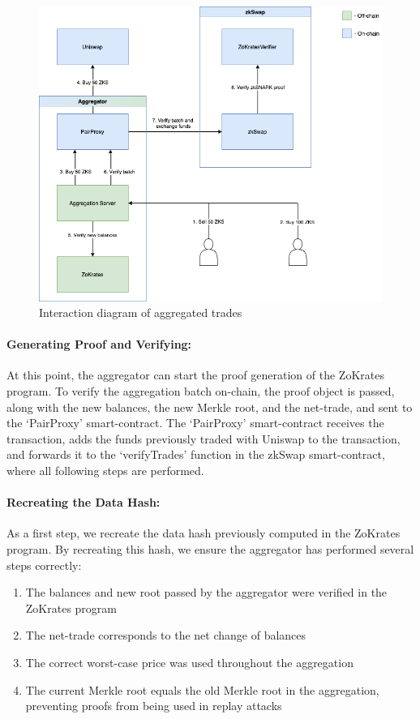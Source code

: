 \documentclass[../../thesis.tex]{subfiles}
\begin{document}
\begin{figure}[h]
    \centerline{\includegraphics[totalheight=10cm]{diagrams/tradeAggrFlow.png}}
    \caption{Interaction diagram of aggregated trades}
    \label{fig:zokrates}
\end{figure}

\paragraph{Generating Proof and Verifying:}
At this point, the aggregator can start the proof generation of the ZoKrates program. To verify the aggregation batch on-chain, the proof object is passed, along with the new balances, the new Merkle root, and the net-trade, and sent to the `PairProxy' smart-contract. The `PairProxy' smart-contract receives the transaction, adds the funds previously traded with Uniswap to the transaction, and forwards it to the `verifyTrades' function in the zkSwap smart-contract, where all following steps are performed. 

\paragraph{Recreating the Data Hash:}
As a first step, we recreate the data hash previously computed in the ZoKrates program. By recreating this hash, we ensure the aggregator has performed several steps correctly:

\begin{enumerate}
    \item The balances and new root passed by the aggregator were verified in the ZoKrates program
    \item The net-trade corresponds to the net change of balances
    \item The correct worst-case price was used throughout the aggregation
    \item The current Merkle root equals the old Merkle root in the aggregation, preventing proofs from being used in replay attacks
\end{enumerate}
\end{document}
